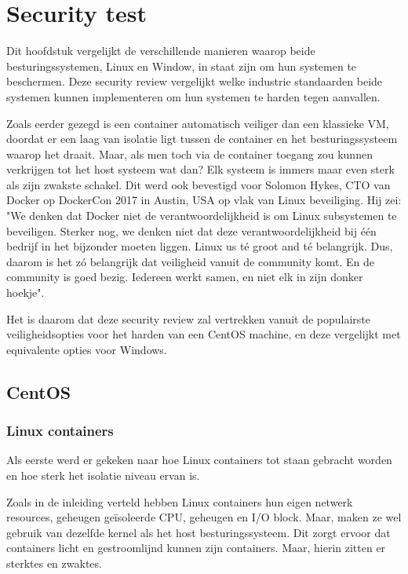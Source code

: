 
\chapter{Security test}
\label{ch:securitytest}

Dit hoofdstuk vergelijkt de verschillende manieren waarop beide besturingssystemen, Linux en Window, in staat zijn om hun systemen te beschermen. Deze security review vergelijkt welke industrie standaarden beide systemen kunnen implementeren om hun systemen te harden tegen aanvallen.

Zoals eerder gezegd is een container automatisch veiliger dan een klassieke VM, doordat er een laag van isolatie ligt tussen de container en het besturingssysteem waarop het draait. Maar, als men toch via de container toegang zou kunnen verkrijgen tot het host systeem wat dan? Elk systeem is immers maar even sterk als zijn zwakste schakel. Dit werd ook bevestigd voor Solomon Hykes, CTO van Docker op DockerCon 2017 in Austin, USA op vlak van Linux beveiliging. Hij zei: "We denken dat Docker niet de verantwoordelijkheid is om Linux subsystemen te beveiligen. Sterker nog, we denken niet dat deze verantwoordelijkheid bij één bedrijf in het bijzonder moeten liggen. Linux us té groot and té belangrijk. Dus, daarom is het zó belangrijk dat veiligheid vanuit de community komt. En de community is goed bezig. Iedereen werkt samen, en niet elk in zijn donker hoekje".

Het is daarom dat deze security review zal vertrekken vanuit de populairste veiligheidsopties voor het harden van een CentOS machine, en deze vergelijkt met equivalente opties voor Windows.

\section{CentOS}
\subsection{Linux containers}
Als eerste werd er gekeken naar hoe Linux containers tot staan gebracht worden en hoe sterk het isolatie niveau ervan is.

Zoals in de inleiding verteld hebben Linux containers hun eigen netwerk resources, geheugen geïsoleerde CPU, geheugen en I/O block. Maar, maken ze wel gebruik van dezelfde kernel als het host besturingssysteem. Dit zorgt ervoor dat containers licht en gestroomlijnd kunnen zijn containers. Maar, hierin zitten er sterktes en zwaktes.

